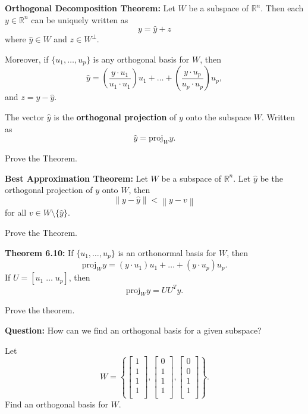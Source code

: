 \documentclass[12pt,letterpaper]{article}
\newcommand{\norm}[1]{\left\lVert#1\right\rVert}
\begin{document}
\newpage

{\bf Orthogonal Decomposition Theorem:} Let $W$ be a subspace of $\mathbb{R}^n$. Then each $y \in \mathbb{R}^n$ can be uniquely written as $$y=\hat{y} + z$$ where $\hat{y} \in W$ and $z \in W^{\perp}$. 

Moreover, if $\{u_1, \dots, u_p\}$ is any orthogonal basis for $W$, then $$\hat{y}= \left(\frac{y \cdot u_1}{u_1 \cdot u_1} \right)u_1+\dots+  \left(\frac{y \cdot u_p}{u_p \cdot u_p} \right)u_p,$$ and $z=y-\hat{y}$.


\begin{defn} The vector $\hat{y}$ is the {\bf orthogonal projection} of $y$ onto the subspace $W$. Written as $$\hat{y}=\text{proj}_{W}{y}.$$
\end{defn} 

\begin{enumerate}

\Problem Prove the Theorem.

\vfill

{\bf Best Approximation Theorem:} Let $W$ be a subspace of $\mathbb{R}^n$. Let $\hat{y}$ be the orthogonal projection of $y$ onto $W$, then $$\norm{y-\hat{y}} < \norm{y-v}$$ for all $v\in W \setminus \{\hat{y}\}$.

\Problem Prove the Theorem.

\vfill

\newpage

{\bf Theorem 6.10:} If $\{ u_1, \dots, u_p\}$ is an orthonormal basis for $W$, then $$\text{proj}_{W}{y} =(y\cdot u_1) u_1 +\dots +(y \cdot u_p) u_p.$$ If $U=[u_1 \; \dots \; u_p]$, then $$\text{proj}_{W}{y} =U U^{T} y.$$ 

\Problem Prove the theorem.

\newpage


{\bf Question:} How can we find an orthogonal basis for a given subspace?


\Problem Let $$W=\left\{\begin{bmatrix}1\\ 1\\ 1\\ 1\\ \end{bmatrix}, \begin{bmatrix}0\\ 1\\ 1\\ 1\\ \end{bmatrix} ,\begin{bmatrix}0\\ 0\\ 1\\ 1\\ \end{bmatrix}\right\}.$$ Find an orthogonal basis for $W$.


\end{enumerate}
\end{document}
